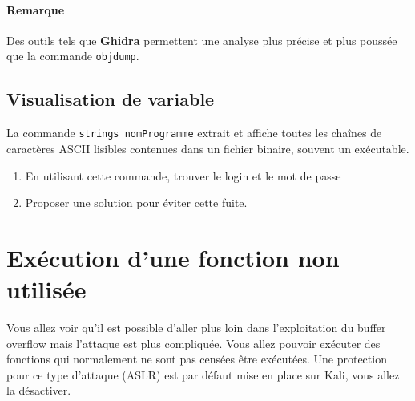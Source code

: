 \documentclass[french, 12pt]{article}%
\newcommand{\itemE}{\item[$\bullet$]}
\newif\ifPROF
\begin{document}
\ifPROF
\color{red}
En début du main en assembleu, il y a une suite de caractère ASCII 
\begin{itemize}
\itemE \verb?char monLog[] = "pviland";?
\itemE \verb?char monMdp[] = "nounours";?
\itemE 
\end{itemize}

\normalcolor
\fi

\paragraph{Remarque} Des outils tels que \textbf{Ghidra} permettent une analyse plus précise et plus poussée que la commande \verb?objdump?.
\subsection{Visualisation de variable}
La commande \verb?strings nomProgramme? extrait et affiche toutes les chaînes de caractères ASCII lisibles contenues dans un fichier binaire, souvent un exécutable.

\begin{enumerate}[resume]
\item En utilisant cette commande, trouver le login et le mot de passe
\item Proposer une solution pour éviter cette fuite. 
\end{enumerate}

\ifPROF
\color{red}
\begin{itemize}
\itemE Login: pviland
\itemE Mot de passe : nounours
\end{itemize}

Comme contre mesure : 
\begin{itemize}
\itemE Ne jamais stocker les mots de passe en dur 
\itemE Chiffrer/encder la chaine directement dans le code
\end{itemize}

\normalcolor
\fi


\section{Exécution d'une fonction non utilisée}

Vous allez voir qu'il est possible d'aller plus loin dans l'exploitation du buffer overflow mais l'attaque est plus compliquée. Vous allez pouvoir exécuter des fonctions qui normalement ne sont pas censées être exécutées. Une protection pour ce type d'attaque (ASLR) est par défaut mise en place sur Kali, vous allez la désactiver. 
\end{document}
